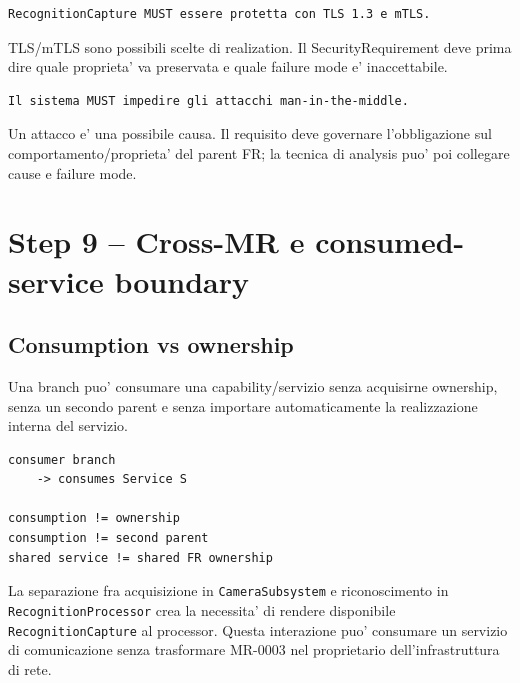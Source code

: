 \documentclass[11pt,a4paper]{article}
\newcommand{\code}[1]{\texttt{#1}}
\begin{document}
\begin{badbox}
\begin{lstlisting}
RecognitionCapture MUST essere protetta con TLS 1.3 e mTLS.
\end{lstlisting}
TLS/mTLS sono possibili scelte di realization. Il SecurityRequirement deve prima dire quale proprieta' va preservata e quale failure mode e' inaccettabile.
\end{badbox}

\begin{badbox}
\begin{lstlisting}
Il sistema MUST impedire gli attacchi man-in-the-middle.
\end{lstlisting}
Un attacco e' una possibile causa. Il requisito deve governare l'obbligazione sul comportamento/proprieta' del parent FR; la tecnica di analysis puo' poi collegare cause e failure mode.
\end{badbox}

\section{Step 9 -- Cross-MR e consumed-service boundary}

\subsection{Consumption vs ownership}

\begin{statusclosed}
Una branch puo' consumare una capability/servizio senza acquisirne ownership, senza un secondo parent e senza importare automaticamente la realizzazione interna del servizio.
\end{statusclosed}

\begin{lstlisting}
consumer branch
    -> consumes Service S

consumption != ownership
consumption != second parent
shared service != shared FR ownership
\end{lstlisting}

\begin{examplebox}
La separazione fra acquisizione in \code{CameraSubsystem} e riconoscimento in \code{RecognitionProcessor} crea la necessita' di rendere disponibile \code{RecognitionCapture} al processor. Questa interazione puo' consumare un servizio di comunicazione senza trasformare MR-0003 nel proprietario dell'infrastruttura di rete.
\end{examplebox}
\end{document}
